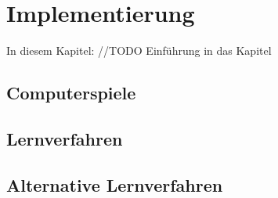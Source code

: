 \chapter{Implementierung}
\label{cha:implementierung}

In diesem Kapitel: //TODO Einführung in das Kapitel

\section{Computerspiele}

\section{Lernverfahren}

\section{Alternative Lernverfahren}
